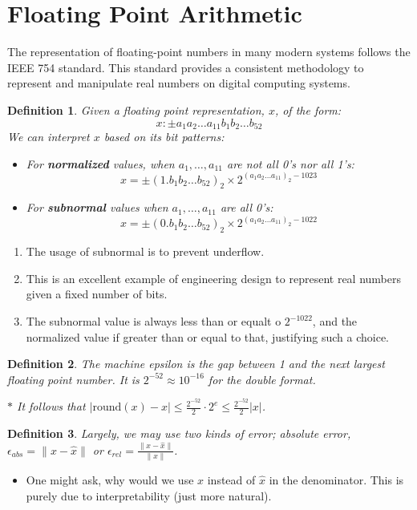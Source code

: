 \documentclass[11pt,reqno]{amsart}
\newtheorem{definition}{Definition}
\theoremstyle{remark}
\begin{document}
\section{Floating Point Arithmetic}

The representation of floating-point numbers in many modern systems follows the IEEE 754 standard. This standard provides a consistent methodology to represent and manipulate real numbers on digital computing systems.

\begin{definition}
Given a floating point representation, \( x \), of the form:
\[ x: \pm a_1a_2 \dots a_{11}b_1b_2 \dots b_{52} \]
We can interpret \( x \) based on its bit patterns:
\begin{itemize}
    \item For \textbf{normalized} values, when \( a_1, \dots, a_{11} \) are not all 0's nor all 1's:
    \[ x = \pm (1.b_1b_2 \dots b_{52})_2 \times 2^{(a_1a_2 \dots a_{11})_2 - 1023} \]
    
    \item For \textbf{subnormal} values when \( a_1, \dots, a_{11} \) are all 0's:
    \[ x = \pm (0.b_1b_2 \dots b_{52})_2 \times 2^{(a_1a_2 \dots a_{11})_2 - 1022} \]
\end{itemize}
\end{definition}
\begin{enumerate}
\item The usage of subnormal is to prevent underflow.
\item This is an excellent example of engineering design to represent real numbers given a fixed number of bits.
\item The subnormal value is always less than or equalt o $2^{-1022}$, and the normalized value if greater than or equal to that, justifying such a choice.
\end{enumerate}
\begin{definition}
The machine epsilon is the gap between 1 and the next largest floating point number. It is $2^{-52}\approx 10^{-16}$ for the double format.

$\ast$ It follows that $\lvert \text{round}(x)-x\rvert\leq\frac{2^{-52}}2\cdot 2^e\leq \frac{2^{-52}}2\lvert x\rvert$.
\end{definition}
\begin{definition}
Largely, we may use two kinds of error; absolute error, $\epsilon_{abs}=\lVert x-\hat x\rVert$ or $\epsilon_{rel} = \frac{\lVert x-\hat x\rVert}{\lVert x\rVert}$.
\end{definition}
\begin{itemize}
\item One might ask, why would we use $x$ instead of $\hat x$ in the denominator. This is purely due to interpretability (just more natural).
\end{itemize}
\end{document}
